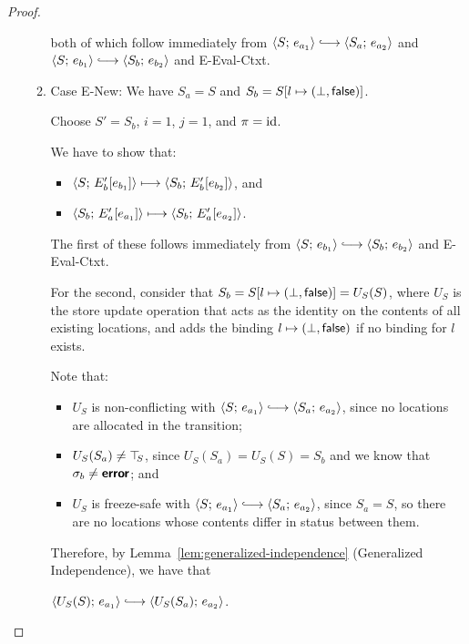 \begin{proof}
\begin{enumerate}
\begin{enumerate}
      both of which follow immediately from $\config{S}{e_{a_1}}
      \parstepsto \config{S_a}{e_{a_2}}$ and $\config{S}{e_{b_1}}
      \parstepsto \config{S_b}{e_{b_2}}$ and {\sc E-Eval-Ctxt}.

    \item \label{slqc-beta-new}Case {\sc E-New}: We have $S_a = S$ and
      $S_b = S[l \mapsto (\bot, \textsf{false})]$.

      Choose $S' = S_b$, $i = 1$, $j = 1$, and $\pi = \mathrm{id}$.

      We have to show that:
      \begin{itemize}
      \item $\langle S;\, E'_b\hspace{-0.5mm}\left[e_{b_1}\right] \rangle \longmapsto
        \langle S_b;\, E'_b\hspace{-0.5mm}\left[e_{b_2}\right] \rangle$, and
      \item $\langle S_b;\, E'_a\hspace{-0.5mm}\left[e_{a_1}\right] \rangle \longmapsto
        \langle S_b;\, E'_a\hspace{-0.5mm}\left[e_{a_2}\right] \rangle$.
      \end{itemize}

      The first of these follows immediately from $\config{S}{e_{b_1}}
      \parstepsto \config{S_b}{e_{b_2}}$ and {\sc E-Eval-Ctxt}.

      For the second, consider that $S_b =
      S[l \mapsto (\bot, \textsf{false})] = U_S(S)$, where $U_S$ is the
      store update operation that acts as the identity on the contents
      of all existing locations, and adds the binding
      $l \mapsto (\bot, \textsf{false})$ if no binding for $l$
      exists.

      Note that:
      \begin{itemize}
      \item $U_S$ is non-conflicting with $\config{S}{e_{a_1}}
        \parstepsto \config{S_a}{e_{a_2}}$, since no locations are
        allocated in the transition;
      \item $U_S(S_a) \neq \top\hspace{-0.85mm}_{S}$, since $U_S(S_a) = U_S(S) = S_b$
        and we know that $\sigma_b \neq \textbf{\textsf{error}}$; and
      \item $U_S$ is freeze-safe with $\config{S}{e_{a_1}}
        \parstepsto \config{S_a}{e_{a_2}}$, since $S_a = S$, so
        there are no locations whose contents differ in status
        between them.
      \end{itemize}

      Therefore, by Lemma~\ref{lem:generalized-independence}
      (Generalized Independence), we have that

      $\config{U_S(S)}{e_{a_1}} \parstepsto
      \config{U_S(S_a)}{e_{a_2}}$.


\end{enumerate}
\end{enumerate}
\end{proof}
